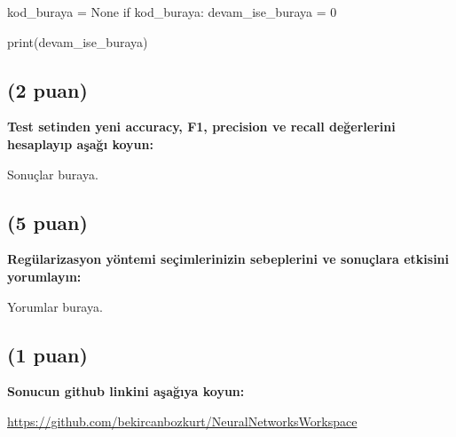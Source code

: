 \documentclass[11pt]{article}
\begin{document}
\begin{python}
kod_buraya = None
if kod_buraya:
    devam_ise_buraya = 0

print(devam_ise_buraya)
\end{python}

\subsection{(2 puan)} \textbf{Test setinden yeni accuracy, F1, precision ve recall değerlerini hesaplayıp aşağı koyun:}

Sonuçlar buraya.

\subsection{(5 puan)} \textbf{Regülarizasyon yöntemi seçimlerinizin sebeplerini ve sonuçlara etkisini yorumlayın:}

Yorumlar buraya.

\subsection{(1 puan)} \textbf{Sonucun github linkini  aşağıya koyun:}

\url{https://github.com/bekircanbozkurt/NeuralNetworksWorkspace}
\end{document}

